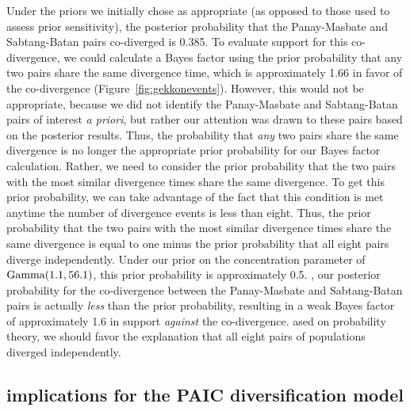 Under the priors we initially chose as appropriate (as opposed to those used to
assess prior sensitivity), the posterior probability that the Panay-Masbate and
Sabtang-Batan pairs co-diverged is 0.385.
To evaluate support for this co-divergence, we could calculate a Bayes factor
using the prior probability that any two pairs share the same divergence time,
which is approximately 1.66 in favor of the co-divergence
(Figure~\ref{fig:gekkonevents}).
However, this would not be appropriate, because we did not identify the
Panay-Masbate and Sabtang-Batan pairs of interest \emph{a priori},
but rather our attention was drawn to these pairs based on the posterior
results.
Thus, the probability that \emph{any} two pairs share the same divergence
is no longer the appropriate prior probability for our Bayes factor calculation.
Rather, we need to consider the prior probability that the two pairs with
the most similar divergence times share the same divergence.
To get this prior probability, we can take advantage of the fact that this
condition is met anytime the number of divergence events is less than eight.
Thus, the prior probability that the two pairs with the most similar divergence
times share the same divergence is equal to one minus the prior probability
that all eight pairs diverge independently.
Under our prior on the concentration parameter of $\textrm{Gamma}(1.1, 56.1)$,
this prior probability is approximately 0.5.
, our posterior probability for the co-divergence between the Panay-Masbate
and Sabtang-Batan pairs is actually \emph{less} than the prior probability,
resulting in a weak Bayes factor of approximately 1.6 in support \emph{against}
the co-divergence.
ased on probability theory, we should favor the explanation that all
eight pairs of  populations diverged independently.

\subsection{ implications for the PAIC diversification model}


